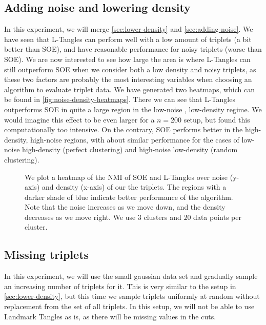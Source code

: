 \subsection{Adding noise and lowering density}
In this experiment, we will merge \autoref{sec:lower-density} and \autoref{sec:adding-noise}. We have seen that L-Tangles can perform well with a low
amount of triplets (a bit better than SOE), and have reasonable performance for noisy triplets (worse than SOE). We are now interested to see how large the area is
where L-Tangles can still outperform SOE when we consider both a low density and noisy triplets, as these two factors are probably the most interesting variables
when choosing an algorithm to evaluate triplet data. We have generated two heatmaps, which can be found in \autoref{fig:noise-density-heatmaps}. 
There we can see that L-Tangles outperforms SOE in quite a large region in the low-noise , low-density regime. We would imagine this effect to be even larger
for a $n=200$ setup, but found this computationally too intensive. On the contrary, SOE performs better in the high-density, high-noise regions, with about similar performance
for the cases of low-noise high-density (perfect clustering) and high-noise low-density (random clustering).

\onecolumn
\begin{figure}[ht]
    \centering
    \caption{
        We plot a heatmap of the NMI of SOE and L-Tangles over noise (y-axis) and density (x-axis) of our the triplets. 
        The regions with a darker shade of blue indicate better performance of the algorithm. 
        Note that the noise increases as we move down, and the
        density decreases as we move right.  We use $3$ clusters and $20$ data points per cluster.
    }
    \label{fig:noise-density-heatmaps}
\end{figure}

\subsection{Missing triplets}
In this experiment, we will use the small gaussian data set and gradually sample an increasing number of triplets for it. 
This is very similar to the setup in \autoref{sec:lower-density}, but this time we sample triplets uniformly at random without replacement
from the set of all triplets. In this setup, we will not be able to use Landmark Tangles as is, as there will be missing values in the cuts. 

